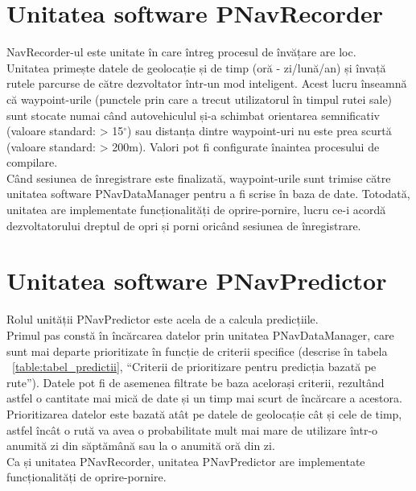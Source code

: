 \section{Unitatea software PNavRecorder} 
NavRecorder-ul este unitate în care întreg procesul de învățare are loc. 
\vspace{6pt}
\\Unitatea primește datele de geolocație și de timp (oră - zi/lună/an) și învață rutele parcurse de către dezvoltator într-un mod inteligent.
Acest lucru înseamnă că waypoint-urile (punctele prin care a trecut utilizatorul în timpul rutei sale) sunt stocate numai când autovehiculul și-a schimbat 
orientarea semnificativ (valoare standard: > 15$^{\circ}$) sau distanța dintre waypoint-uri nu este prea scurtă (valoare standard: > 200m). Valori pot fi configurate înaintea procesului de compilare.
\vspace{6pt}
\\Când sesiunea de înregistrare este finalizată, waypoint-urile sunt trimise către unitatea software PNavDataManager pentru a fi scrise în baza de date.
Totodată, unitatea are implementate funcționalități de oprire-pornire, lucru ce-i acordă dezvoltatorului dreptul de opri și porni oricând sesiunea de înregistrare.


\section{Unitatea software PNavPredictor} 
Rolul unității PNavPredictor este acela de a calcula predicțiile. 
\vspace{6pt}
\\Primul pas constă în încărcarea datelor prin unitatea PNavDataManager, care sunt mai departe prioritizate în funcție de criterii specifice (descrise în tabela ~\ref{table:tabel_predictii}, ``Criterii de prioritizare pentru predicția bazată pe rute''). Datele pot fi de asemenea filtrate be baza acelorași criterii, rezultând astfel o cantitate mai mică de date și un timp mai scurt de încărcare a acestora. 
\vspace{6pt}
\\Prioritizarea datelor este bazată atât pe datele de geolocație cât și cele de timp, astfel încât o rută va avea o probabilitate mult mai mare de utilizare într-o anumită zi din săptămână sau la o anumită oră din zi.
\vspace{6pt}
\\Ca și unitatea PNavRecorder, unitatea PNavPredictor are implementate funcționalități de oprire-pornire.


